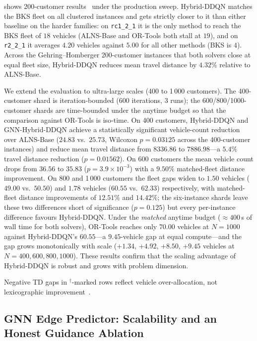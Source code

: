 \documentclass[conference]{IEEEtran}
\begin{document}
 shows 200-customer results~\cite{Gehring1999} under the
production sweep. Hybrid-DDQN matches the BKS fleet on all clustered instances and
gets strictly closer to it than either baseline on the harder families: on
\texttt{rc1\_2\_1} it is the only method to reach the BKS fleet of $18$ vehicles
(ALNS-Base and OR-Tools both stall at $19$), and on \texttt{r2\_2\_1} it averages
$4.20$ vehicles against $5.00$ for all other methods (BKS is $4$). Across the
Gehring--Homberger 200-customer instances that both solvers close at equal fleet
size, Hybrid-DDQN reduces mean travel distance by $4.32\%$ relative to ALNS-Base.

We extend the evaluation to ultra-large scales (400 to 1\,000 customers). The
400-customer shard is iteration-bounded (600 iterations, 3 runs); the
600/800/1000-customer shards are time-bounded under the anytime budget so that the
comparison against OR-Tools is iso-time. On 400 customers, Hybrid-DDQN and GNN-Hybrid-DDQN achieve a
statistically significant vehicle-count reduction over ALNS-Base ($24.83$ vs.\
$25.73$, Wilcoxon $p=0.03125$ across the 400-customer instances) and reduce mean travel distance from $8336.86$ to $7886.98$---a $5.4\%$ travel distance reduction ($p=0.01562$). On 600 customers the mean vehicle count drops from
$36.56$ to $\mathbf{35.83}$ ($p=3.9{\times}10^{-3}$) with a $9.50\%$ matched-fleet
distance improvement. On 800 and 1\,000 customers the fleet gaps widen to $1.50$
vehicles ($49.00$ vs.\ $50.50$) and $\mathbf{1.78}$ vehicles ($60.55$ vs.\
$62.33$) respectively, with matched-fleet distance improvements of $12.51\%$ and
$14.42\%$; the six-instance shards leave these two differences short of
significance ($p=0.125$) but every per-instance difference favours Hybrid-DDQN.
Under the \emph{matched} anytime budget ($\approx 400$\,s of wall time for both
solvers), OR-Tools reaches only $70.00$ vehicles at $N{=}1000$ against Hybrid-DDQN's
$60.55$---a $9.45$-vehicle gap at equal compute---and the gap grows monotonically
with scale ($+1.34$, $+4.92$, $+8.50$, $+9.45$ vehicles at $N{=}400,600,800,1000$).
These results confirm that the scaling advantage of Hybrid-DDQN is robust and
grows with problem dimension.

Negative TD gaps in ${}^\dagger$-marked rows reflect vehicle over-allocation, not lexicographic
improvement~\cite{pisinger2007general}.
\subsection{GNN Edge Predictor: Scalability and an Honest Guidance Ablation}
\label{subsec:gnn_validation}
\end{document}
